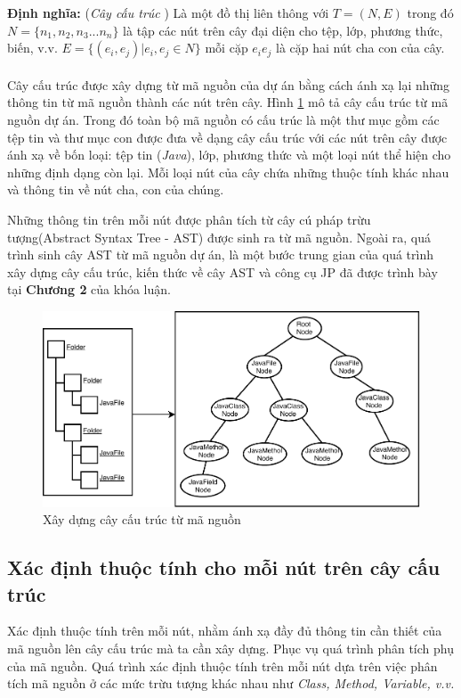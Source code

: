 \documentclass[12pt]{report}
\begin{document}
\noindent \textbf{Định nghĩa: }(\textit{Cây cấu trúc} \cite{jcia}) Là một đồ thị liên thông với $T = (N,E)$ trong đó $N = \{n_1,n_2,n_3...n_n \}$ là tập các nút trên cây đại diện cho tệp, lớp, phương thức, biến, v.v. $E = \{(e_i,e_j) | e_i, e_j \in N \}$ mỗi cặp $e_ie_j$ là cặp hai nút cha con của cây.\\\\
Cây cấu trúc được xây dựng từ mã nguồn của dự án bằng cách ánh xạ lại những thông tin từ mã nguồn thành các nút trên cây. Hình \ref{fig:universe} mô tả cây cấu trúc từ mã nguồn dự án. Trong đó toàn bộ mã nguồn có cấu trúc là một thư mục gồm các tệp tin và thư mục con được đưa về dạng cây cấu trúc với các nút trên cây được ánh xạ về bốn loại: tệp tin (\textit{Java}), lớp, phương thức và một loại nút thể hiện cho những định dạng còn lại. Mỗi loại nút của cây chứa những thuộc tính khác nhau và thông tin về nút cha, con của chúng.

\noindent Những thông tin trên mỗi nút được phân tích từ cây cú pháp trừu tượng(Abstract Syntax Tree - AST) được sinh ra từ mã nguồn. Ngoài ra, quá trình sinh cây AST từ mã nguồn dự án, là một bước trung gian của quá trình xây dựng cây cấu trúc, kiến thức về cây AST và công cụ JP đã được trình bày tại \textbf{Chương 2} của khóa luận.
\begin{figure}[!htbp]
	\centering
	\vspace{0.5cm}
	\includegraphics[scale=0.9]{images/structure_tree.pdf}
	\caption{Xây dựng cây cấu trúc từ mã nguồn}
	\label{fig:universe}
\end{figure}
\subsection{Xác định thuộc tính cho mỗi nút trên cây cấu trúc}
Xác định thuộc tính trên mỗi nút, nhằm ánh xạ đầy đủ thông tin cần thiết của mã nguồn lên cây cấu trúc mà ta cần xây dựng. Phục vụ quá trình phân tích phụ của mã nguồn. Quá trình xác định thuộc tính trên mỗi nút dựa trên việc phân tích mã nguồn ở các mức trừu tượng khác nhau như \textit{Class, Method, Variable, v.v.}
\end{document}
